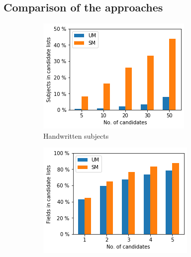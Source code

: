 \subsection{Comparison of the approaches} \label{results_final}

\begin{figure}
  \begin{subfigure}[t]{.32\textwidth}
    \centering
    \includegraphics[width=\textwidth]{figures/supervised_approach/compare_hw.png}
    \caption{Handwritten subjects}
    \label{fig:compare_hw}
  \end{subfigure}
  \begin{subfigure}[t]{.32\textwidth}
    \centering
    \includegraphics[width=\textwidth]{figures/supervised_approach/compare_ddc.png}

\end{subfigure}
\end{figure}
